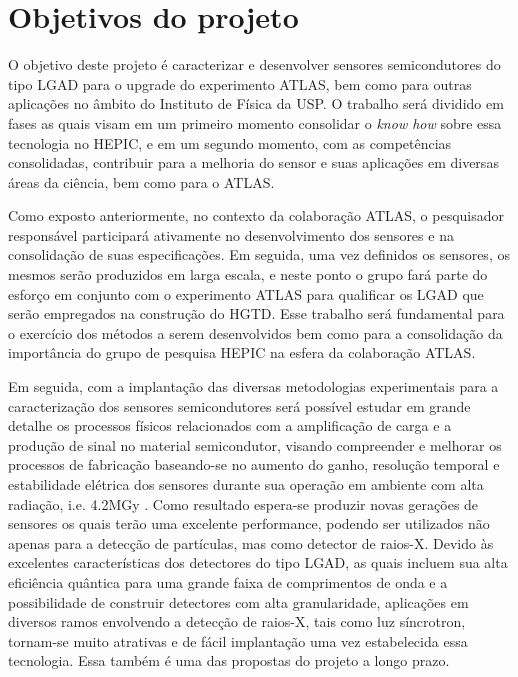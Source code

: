 \chapter{Objetivos do projeto}

O objetivo deste projeto é caracterizar e desenvolver sensores semicondutores do tipo LGAD para o upgrade do experimento ATLAS, bem como para outras aplicações no âmbito do Instituto de Física da USP. O trabalho será dividido em fases as quais visam em um primeiro momento consolidar o {\it know how} sobre essa tecnologia no HEPIC, e em um segundo momento, com as competências consolidadas, contribuir para a melhoria do sensor e suas aplicações em diversas áreas da ciência, bem como para o ATLAS.

Como exposto anteriormente, no contexto da colaboração ATLAS, o pesquisador responsável participará ativamente no desenvolvimento dos sensores e na consolidação de suas especificações. Em seguida, uma vez definidos os sensores, os mesmos serão produzidos em larga escala, e neste ponto o grupo fará parte do esforço em conjunto com o experimento ATLAS para qualificar os LGAD que serão empregados na construção do HGTD. Esse trabalho será fundamental para o exercício dos métodos a serem desenvolvidos bem como para a consolidação da importância do grupo de pesquisa HEPIC na esfera da colaboração ATLAS.

Em seguida, com a implantação das diversas metodologias experimentais para a caracterização dos sensores semicondutores será possível estudar em grande detalhe os processos físicos relacionados com a amplificação de carga e a produção de sinal no material semicondutor, visando compreender e melhorar os processos de fabricação baseando-se no aumento do ganho, resolução temporal e estabilidade elétrica dos sensores durante sua operação em ambiente com alta radiação, i.e. 4.2MGy \cite{tdr}. 
Como resultado espera-se produzir novas gerações de sensores os quais terão uma excelente performance, podendo ser utilizados não apenas para a detecção de partículas, mas como detector de raios-X. Devido às excelentes características dos detectores do tipo LGAD, as quais incluem sua alta eficiência quântica para uma grande faixa de comprimentos de onda e a possibilidade de construir detectores com alta granularidade, aplicações em diversos ramos envolvendo a detecção de raios-X, tais como luz síncrotron, tornam-se muito atrativas e de fácil implantação uma vez estabelecida essa tecnologia. Essa também é uma das propostas do projeto a longo prazo.

